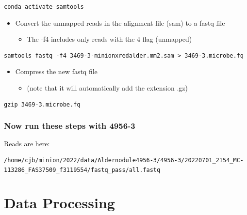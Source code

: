 \documentclass[
]{book}
\providecommand{\tightlist}{%
  \setlength{\itemsep}{0pt}\setlength{\parskip}{0pt}}
\begin{document}
\begin{verbatim}
conda activate samtools
\end{verbatim}

\begin{itemize}
\tightlist
\item
  Convert the unmapped reads in the alignment file (sam) to a fastq file

  \begin{itemize}
  \tightlist
  \item
    The -f4 includes only reads with the 4 flag (unmapped)
  \end{itemize}
\end{itemize}

\begin{verbatim}
samtools fastq -f4 3469-3-minionxredalder.mm2.sam > 3469-3.microbe.fq
\end{verbatim}

\begin{itemize}
\tightlist
\item
  Compress the new fastq file

  \begin{itemize}
  \tightlist
  \item
    (note that it will automatically add the extension .gz)
  \end{itemize}
\end{itemize}

\begin{verbatim}
gzip 3469-3.microbe.fq
\end{verbatim}

\hypertarget{now-run-these-steps-with-4956-3}{%
\subsection*{Now run these steps with 4956-3}\label{now-run-these-steps-with-4956-3}}

Reads are here:

\begin{verbatim}
/home/cjb/minion/2022/data/Aldernodule4956-3/4956-3/20220701_2154_MC-113286_FAS37509_f3119554/fastq_pass/all.fastq
\end{verbatim}

\hypertarget{data-processing}{%
\chapter{Data Processing}\label{data-processing}}
\end{document}
